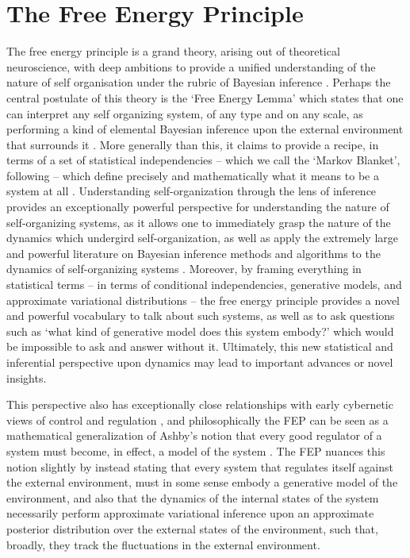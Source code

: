 
\chapter{The Free Energy Principle}

The free energy principle is a grand theory, arising out of theoretical neuroscience, with deep ambitions to provide a unified understanding of the nature of self organisation under the rubric of Bayesian inference \citep{friston2006free,friston_free_2019,friston2010free,friston2012free}. Perhaps the central postulate of this theory is the `Free Energy Lemma' which states that one can interpret any self organizing system, of any type and on any scale, as performing a kind of elemental Bayesian inference upon the external environment that surrounds it \citep{friston2013life,friston2012ao,friston2019particularphysics}. More generally than this, it claims to provide a recipe, in terms of a set of statistical independencies -- which we call the `Markov Blanket', following \citep{pearl2011bayesian} -- which define precisely and mathematically what it means to be a system at all \citep{friston2019particularphysics}. Understanding self-organization through the lens of inference provides an exceptionally powerful perspective for understanding the nature of self-organizing systems, as it allows one to immediately grasp the nature of the dynamics which undergird self-organization, as well as apply the extremely large and powerful literature on Bayesian inference methods and algorithms to the dynamics of self-organizing systems \citep{parr2020modules,parr2020markov,yedidia2011message}. 
Moreover, by framing everything in statistical terms -- in terms of conditional independencies, generative models, and approximate variational distributions -- the free energy principle provides a novel and powerful vocabulary to talk about such systems, as well as to ask questions such as `what kind of generative model does this system embody?' \citep{baltieri2020predictions} which would be impossible to ask and answer without it. Ultimately, this new statistical and inferential perspective upon dynamics may lead to important advances or novel insights.

This perspective also has exceptionally close relationships with early cybernetic views of control and regulation \citep{wiener2019cybernetics,conant1970every,kalman1960new}, and philosophically the FEP can be seen as a mathematical generalization of Ashby's notion that every good regulator of a system must become, in effect, a model of the system \citep{conant1970every}. The FEP nuances this notion slightly by instead stating that every system that regulates itself against the external environment, must in some sense embody a generative model of the environment, and also that the dynamics of the internal states of the system necessarily perform approximate variational inference upon an approximate posterior distribution over the external states of the environment, such that, broadly, they track the fluctuations in the external environment.


